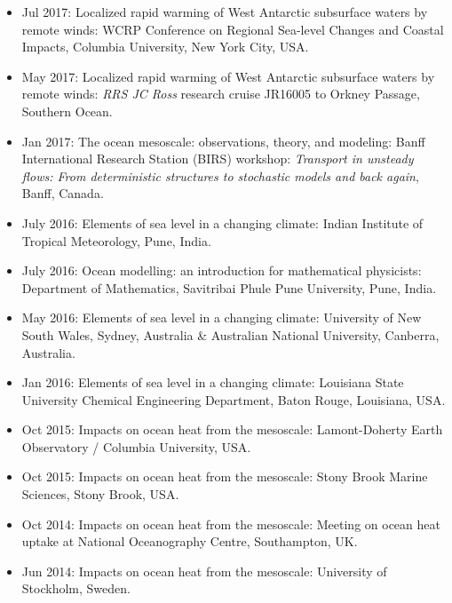 \documentclass{article}
\begin{document}
\begin{itemize}[leftmargin=*]
\item Jul 2017: {\sc Localized rapid warming of West Antarctic
    subsurface waters by remote winds}: WCRP Conference on Regional
  Sea-level Changes and Coastal Impacts, Columbia University, New York City, USA. 

\item May 2017: {\sc Localized rapid warming of West Antarctic
    subsurface waters by remote winds}: {\it RRS JC Ross} research cruise
  JR16005 to Orkney Passage, Southern Ocean.

\item Jan 2017: {\sc The ocean mesoscale: observations, theory, and
    modeling}: Banff International Research Station (BIRS) workshop:
  {\it Transport in unsteady flows: From deterministic structures to
    stochastic models and back again}, Banff, Canada.

\item July 2016: {\sc Elements of sea level in a changing climate}:
  Indian Institute of Tropical Meteorology, Pune, India.

\item July 2016: {\sc Ocean modelling: an introduction for
    mathematical physicists}: Department of Mathematics, Savitribai
  Phule Pune University, Pune, India.

\item May 2016: {\sc Elements of sea level in a changing climate}:
  University of New South Wales, Sydney, Australia \& Australian
  National University, Canberra, Australia.

\item Jan 2016: {\sc Elements of sea level in a changing climate}:
  Louisiana State University Chemical Engineering Department, Baton
  Rouge, Louisiana, USA.

\item Oct 2015: {\sc Impacts on ocean heat from the mesoscale}:
  Lamont-Doherty Earth Observatory / Columbia University, USA.

\item Oct 2015: {\sc Impacts on ocean heat from the mesoscale}: Stony
  Brook Marine Sciences, Stony Brook, USA.

\item Oct 2014: {\sc Impacts on ocean heat from the mesoscale}:
  Meeting on ocean heat uptake at National Oceanography Centre,
  Southampton, UK.

\item Jun 2014: {\sc Impacts on ocean heat from the mesoscale}:
  University of Stockholm, Sweden.


\end{itemize}
\end{document}
